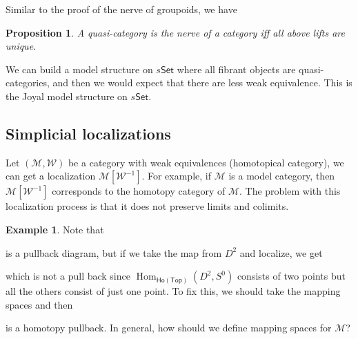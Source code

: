 \documentclass[12pt]{amsart}
\newtheorem{prop}[thm]{Proposition}
\theoremstyle{definition}
\newtheorem{example}[thm]{Example}
\theoremstyle{remark}
\numberwithin{equation}{section}
\newcommand{\cm}{{\mathcal{M}}}
\newcommand{\CW}{{\mathcal{W}}}
\newcommand{\1}{{\mathbb{1}}}
\newcommand{\set}{\mathsf{Set}}
\newcommand{\ho}{\mathsf{Ho}}
\newcommand{\Top}{\mathsf{Top}}
\newcommand{\Hom}{\operatorname{Hom}}
\newcommand{\map}{\operatorname{Map}}
\begin{document}
Similar to the proof of the nerve of groupoids, we have
\begin{prop}
A quasi-category is the nerve of a category iff all above lifts are unique.
\end{prop}
We can build a model structure on $s\set$ where all fibrant objects are quasi-categories, and then we would expect that there are less weak equivalence. This is the Joyal model structure on $s\set$.



\subsection{Simplicial localizations}
Let $(\cm,\CW)$ be a category with weak equivalences (homotopical category), we can get a localization $\cm[\CW^{-1}]$. For example, if $\cm$ is a model category, then $\cm[\CW^{-1}]$ corresponds to the homotopy category of $\cm$. The problem with this localization process is that it does not preserve limits and colimits.

\begin{example}
	Note that
	\begin{center}
	\end{center}
\end{example}
is a pullback diagram, but if we take the map from $D^2$ and localize, we get
\begin{center}
\end{center}
which is not a pull back since  $\Hom_{\ho(\Top)}(D^2, S^0)$ consists of two points but all the others consist of just one point. To fix this, we should take the mapping spaces and then

\begin{center}
\end{center}
is a homotopy pullback. In general, how should we define mapping spaces for $\cm$?
\end{document}
